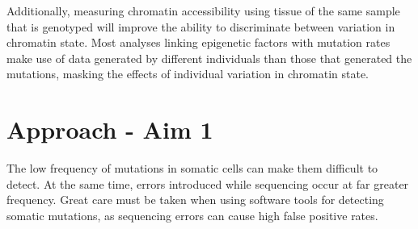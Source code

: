 Additionally, measuring chromatin accessibility using tissue of the same sample that is genotyped will improve the ability to discriminate between variation in chromatin state.
Most analyses linking epigenetic factors with mutation rates make use of data generated by different individuals than those that generated the mutations, masking the effects of individual variation in chromatin state.







\section{Approach - Aim 1}
The low frequency of mutations in somatic cells can make them difficult to detect.
At the same time, errors introduced while sequencing occur at far greater frequency.
Great care must be taken when using software tools for detecting somatic mutations, as sequencing errors can cause high false positive rates.

